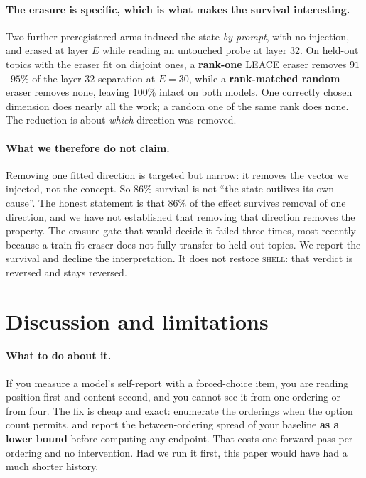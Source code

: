 \documentclass{article}
\begin{document}
\paragraph{The erasure is specific, which is what makes the survival interesting.} Two further
preregistered arms induced the state \emph{by prompt}, with no injection, and erased at layer $E$
while reading an untouched probe at layer $32$. On held-out topics with the eraser fit on disjoint
ones, a \textbf{rank-one} LEACE eraser \citep{belrose2023} removes $91$--$95\%$ of the layer-32
separation at $E{=}30$, while a \textbf{rank-matched random} eraser removes none, leaving $100\%$
intact on both models. One correctly chosen dimension does nearly all the work; a random one of the
same rank does none. The reduction is about \emph{which} direction was removed.

\paragraph{What we therefore do not claim.} Removing one fitted direction is targeted but narrow: it
removes the vector we injected, not the concept. So $86\%$ survival is not ``the state outlives its
own cause''. The honest statement is that $86\%$ of the effect survives removal of one direction,
and we have not established that removing that direction removes the property. The erasure gate that
would decide it failed three times, most recently because a train-fit eraser does not fully transfer
to held-out topics. We report the survival and decline the interpretation. It does not restore
\textsc{shell}: that verdict is reversed and stays reversed.

\section{Discussion and limitations}
\label{sec:discussion}

\paragraph{What to do about it.} If you measure a model's self-report with a forced-choice item,
you are reading position first and content second, and you cannot see it from one ordering or from
four. The fix is cheap and exact: enumerate the orderings when the option count permits, and report
the between-ordering spread of your baseline \textbf{as a lower bound} before computing any
endpoint. That costs one forward pass per ordering and no intervention. Had we run it first, this
paper would have had a much shorter history.
\end{document}

